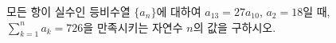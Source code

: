 모든 항이 실수인 등비수열 $\{a_n\}$에 대하여 $a_{13}=27a_{10}$, $a_2=18$일 때, $\displaystyle\sum_{k=1}^{n} a_k=726$을 만족시키는 자연수 $n$의 값을 구하시오.
